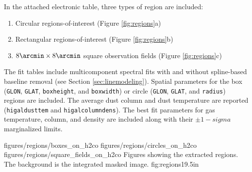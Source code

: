 In the attached electronic table, three types of region are included: 
\begin{enumerate}
    \item Circular regions-of-interest (Figure \ref{fig:regions}a)
    \item Rectangular regions-of-interest (Figure \ref{fig:regions}b)
    \item $8\arcmin \times 8\arcmin$ square observation fields (Figure \ref{fig:regions}c)
\end{enumerate}
The fit tables include multicomponent spectral fits with and without
spline-based baseline removal (see Section \ref{sec:linemodeling}).
Spatial parameters for the box (\texttt{GLON}, \texttt{GLAT},
\texttt{boxheight}, and \texttt{boxwidth}) or circle (\texttt{GLON},
\texttt{GLAT}, and \texttt{radius}) regions are included.  The average dust
column and dust temperature are reported (\texttt{higaldusttem} and
\texttt{higalcolumndens}).  The best fit parameters for gas temperature, \para
column, and \hh density are included along with their $\pm1-sigma$ marginalized
limits.

\RotFigureThreeAA
{figures/regions/boxes_on_h2co}
{figures/regions/circles_on_h2co}
{figures/regions/square_fields_on_h2co}
{Figures showing the extracted regions.  The background is the integrated
masked \para \threeohthree image.}
{fig:regions}{1}{9.5in}





